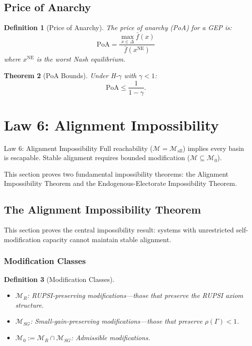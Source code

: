 \documentclass[12pt]{article}
\newtheorem{theorem}{Theorem}[section]
\newtheorem{definition}[theorem]{Definition}
\begin{document}
\subsection{Price of Anarchy}

\begin{definition}[Price of Anarchy]
The \emph{price of anarchy} (PoA) for a GEP is:
\[
\text{PoA} = \frac{\max_{x \in \Delta} \bar{f}(x)}{\bar{f}(x^{\text{NE}})}
\]
where $x^{\text{NE}}$ is the worst Nash equilibrium.
\end{definition}

\begin{theorem}[PoA Bounds]
Under H-$\gamma$ with $\gamma < 1$:
\[
\text{PoA} \leq \frac{1}{1 - \gamma}.
\]
\end{theorem}



\section{Law 6: Alignment Impossibility}
\label{sec:law6}

\begin{lawbox}{Law 6: Alignment Impossibility}
Full reachability ($\mathcal{M} = \mathcal{M}_{\text{all}}$) implies every basin is escapable. Stable alignment requires bounded modification ($\mathcal{M} \subseteq \mathcal{M}_0$).
\end{lawbox}

This section proves two fundamental impossibility theorems: the Alignment Impossibility Theorem and the Endogenous-Electorate Impossibility Theorem.

\subsection{The Alignment Impossibility Theorem}
\label{sec:alignment-impossibility}

This section proves the central impossibility result: systems with unrestricted self-modification capacity cannot maintain stable alignment.

\subsubsection{Modification Classes}

\begin{definition}[Modification Classes]
\begin{itemize}
    \item $\mathcal{M}_R$: \emph{RUPSI-preserving} modifications---those that preserve the RUPSI axiom structure.
    \item $\mathcal{M}_{SG}$: \emph{Small-gain-preserving} modifications---those that preserve $\rho(\Gamma) < 1$.
    \item $\mathcal{M}_0 := \mathcal{M}_R \cap \mathcal{M}_{SG}$: \emph{Admissible} modifications.
\end{itemize}
\end{definition}
\end{document}

